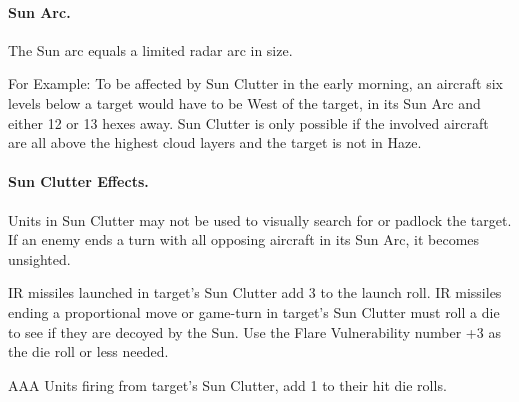 \begin{advancedrules}
{\paragraph{Sun Arc.} The Sun arc equals a limited radar arc in size. 



For Example: To be affected by Sun Clutter in the early morning, an aircraft six levels below a target would have to be West of the target, in its Sun Arc and either 12 or 13 hexes away. Sun Clutter is only possible if the involved aircraft are all above the highest cloud layers and the target is not in Haze.

\paragraph{Sun Clutter Effects.} Units in Sun Clutter may not be used to visually search for or padlock the target. If an enemy ends a turn with all opposing aircraft in its Sun Arc, it becomes unsighted.

IR missiles launched in target's Sun Clutter add 3 to the launch roll. IR missiles ending a proportional move or game-turn in target's Sun Clutter must roll a die to see if they are decoyed by the Sun. Use the Flare Vulnerability number +3 as the die roll or less needed.

AAA Units firing from target's Sun Clutter, add 1 to their hit die rolls.

}{

}
\end{advancedrules}
